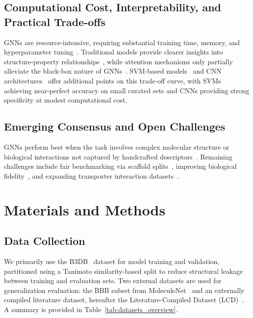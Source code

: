 \documentclass[conference]{IEEEtran}
\begin{document}
\subsection{Computational Cost, Interpretability, and Practical Trade-offs}

GNNs are resource-intensive, requiring substantial training time,
memory, and hyperparameter tuning~\cite{Ding2022,Gautam2022}.
Traditional models provide clearer insights into structure-property
relationships~\cite{Zhu2025,Yu2022}, while attention mechanisms only
partially alleviate the black-box nature of GNNs~\cite{Koutroumpa2025,Tang2022}.
SVM-based models~\cite{Roy2019} and CNN architectures~\cite{Alsenan2021}
offer additional points on this trade-off curve, with SVMs achieving
near-perfect accuracy on small curated sets and CNNs providing strong
specificity at modest computational cost.

\subsection{Emerging Consensus and Open Challenges}

GNNs perform best when the task involves complex molecular structure or biological interactions not captured by handcrafted descriptors~\cite{Collins2024,Ding2022}. Remaining challenges include fair benchmarking via scaffold splits~\cite{Tong2022}, improving biological fidelity~\cite{Cornelissen2023,Collins2024}, and expanding transporter interaction datasets~\cite{Kumar2022}.

\section{Materials and Methods}

\subsection{Data Collection}

We primarily use the B3DB~\cite{Meng_A_curated_diverse_2021} dataset
for model training and validation, partitioned using a Tanimoto
similarity-based split to reduce structural leakage between training
and evaluation sets. Two external datasets are used for generalization
evaluation: the BBB subset from MoleculeNet~\cite{wu2018moleculenet}
and an externally compiled literature dataset, hereafter the
Literature-Compiled Dataset (LCD)~\cite{Tong2022}.
A summary is provided in Table~\ref{tab:datasets_overview}.
\end{document}
